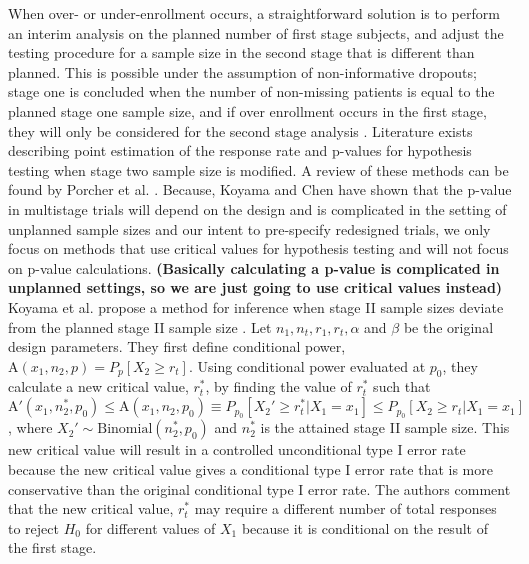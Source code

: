 \documentclass[12pt]{report}\usepackage[]{graphicx}\usepackage[]{color}
\newlength{\li}\setlength{\li}{14.48pt}
\newlength{\di}\setlength{\di}{-3.5mm}
\begin{document}
When over- or under-enrollment occurs, a straightforward solution is to perform an interim analysis on the planned number of first stage subjects, and adjust the testing procedure for a sample size in the second stage that is different than planned. This is possible under the assumption of non-informative dropouts; stage one is concluded when the number of non-missing patients is equal to the planned stage one sample size, and if over enrollment occurs in the first stage, they will only be considered for the second stage analysis \cite{Koyama}. Literature exists describing point estimation of the response rate and p-values for hypothesis testing when stage two sample size is modified. A review of these methods can be found by Porcher et al. \cite{Porcher}. Because, Koyama and Chen have shown that the p-value in multistage trials will depend on the design and is complicated in the setting of unplanned sample sizes \cite{Koyama} and our intent to pre-specify redesigned trials, we only focus on methods that use critical values for hypothesis testing and will not focus on p-value calculations. \textbf{(Basically calculating a p-value is complicated in unplanned settings, so we are just going to use critical values instead)} Koyama et al. propose a method for inference when stage II sample sizes deviate from the planned stage II sample size \cite{Koyama}. Let $n_1, n_t, r_1, r_t, \alpha$ and $\beta$ be the original design parameters. They first define conditional power, $\mbox{A}(x_1, n_2, p) = P_p[X_2 \geq r_t].$ Using conditional power evaluated at $p_0$, they calculate a new critical value, $r_t^\ast$, by finding the value of $r_t^\ast$ such that $\mbox{A}'(x_1, n_2^\ast, p_0) \leq \mbox{A}(x_1, n_2, p_0) \equiv P_{p_0}[X_2' \geq r_t^\ast | X_1 = x_1] \leq P_{p_0}[X_2 \geq r_t | X_1 = x_1]$, where $X_2' \sim \mbox{Binomial}(n_2^\ast, p_0)$ and $n_2^\ast$ is the attained stage II sample size. This new critical value will result in a controlled unconditional type I error rate because the new critical value gives a conditional type I error rate that is more conservative than the original conditional type I error rate. The authors comment that the new critical value, $r_t^\ast$ may require a different number of total responses to reject $H_0$ for different values of $X_1$ because it is conditional on the result of the first stage. 
\end{document}
